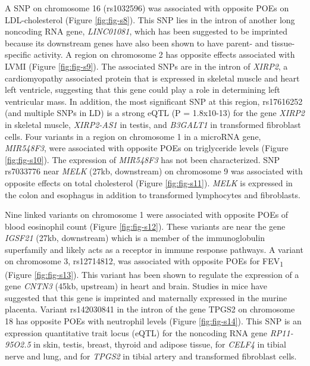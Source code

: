  A SNP on chromosome 16 (rs1032596) was associated with opposite POEs on LDL-cholesterol (Figure \ref{fig:fig-s8}). This SNP lies in the intron of another long noncoding RNA gene, \emph{LINC01081}, which has been suggested to be imprinted because its downstream genes have also been shown to have parent- and tissue-specific activity\cite{Szafranski:2016fz}. A region on chromosome 2 has opposite effects associated with LVMI (Figure \ref{fig:fig-s9}). The associated SNPs are in the intron of \emph{XIRP2}, a cardiomyopathy associated protein that is expressed in skeletal muscle and heart left ventricle, suggesting that this gene could play a role in determining left ventricular mass\cite{Wang:2014jg,Nilsson:2013jy,Consortium2015}. In addition, the most significant SNP at this region, rs17616252 (and multiple SNPs in LD) is a strong eQTL (P = 1.8x10-13) for the gene \emph{XIRP2} in skeletal muscle, \emph{XIRP2-AS1} in testis, and \emph{B3GALT1} in transformed fibroblast cells\cite{Consortium2015}. Four variants in a region on chromosome 1 in a microRNA gene, \emph{MIR548F3}, were associated with opposite POEs on triglyceride levels (Figure \ref{fig:fig-s10}). The expression of \emph{MIR548F3} has not been characterized. SNP rs7033776 near \emph{MELK} (27kb, downstream) on chromosome 9 was associated with opposite effects on total cholesterol (Figure \ref{fig:fig-s11}). \emph{MELK} is expressed in the colon and esophagus in addition to transformed lymphocytes and fibroblasts\cite{Consortium2015}. 


Nine linked variants on chromosome 1 were associated with opposite POEs of blood eosinophil count (Figure \ref{fig:fig-s12}). These variants are near the gene \emph{IGSF21} (27kb, downstream) which is a member of the immunoglobulin superfamily and likely acts as a receptor in immune response pathways\cite{OLeary:2016cm}. A variant on chromosome 3, rs12714812, was associated with opposite POEs for FEV\textsubscript{1} (Figure \ref{fig:fig-s13}). This variant has been shown to regulate the expression of a gene \emph{CNTN3} (45kb, upstream) in heart and brain\cite{Consortium2015}. Studies in mice have suggested that this gene is imprinted and maternally expressed in the murine placenta\cite{Brideau:2010gz}. Variant rs142030841 in the intron of the gene TPGS2 on chromosome 18 has opposite POEs with neutrophil levels (Figure \ref{fig:fig-s14}). This SNP is an expression quantitative trait locus (eQTL) for the noncoding RNA gene \emph{RP11-95O2.5} in skin, testis, breast, thyroid and adipose tissue, for \emph{CELF4} in tibial nerve and lung, and for \emph{TPGS2} in tibial artery and transformed fibroblast cells\cite{Consortium2015}.



